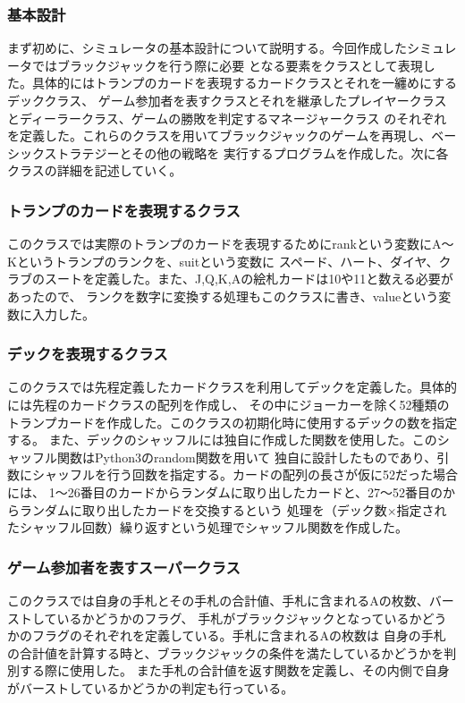 \subsubsection{基本設計}
まず初めに、シミュレータの基本設計について説明する。今回作成したシミュレータではブラックジャックを行う際に必要
となる要素をクラスとして表現した。具体的にはトランプのカードを表現するカードクラスとそれを一纏めにするデッククラス、
ゲーム参加者を表すクラスとそれを継承したプレイヤークラスとディーラークラス、ゲームの勝敗を判定するマネージャークラス
のそれぞれを定義した。これらのクラスを用いてブラックジャックのゲームを再現し、ベーシックストラテジーとその他の戦略を
実行するプログラムを作成した。次に各クラスの詳細を記述していく。

\subsubsection{トランプのカードを表現するクラス}
このクラスでは実際のトランプのカードを表現するためにrankという変数にA～Kというトランプのランクを、suitという変数に
スペード、ハート、ダイヤ、クラブのスートを定義した。また、J,Q,K,Aの絵札カードは10や11と数える必要があったので、
ランクを数字に変換する処理もこのクラスに書き、valueという変数に入力した。

\subsubsection{デックを表現するクラス}
このクラスでは先程定義したカードクラスを利用してデックを定義した。具体的には先程のカードクラスの配列を作成し、
その中にジョーカーを除く52種類のトランプカードを作成した。このクラスの初期化時に使用するデックの数を指定する。
また、デックのシャッフルには独自に作成した関数を使用した。このシャッフル関数はPython3のrandom関数を用いて
独自に設計したものであり、引数にシャッフルを行う回数を指定する。カードの配列の長さが仮に52だった場合には、
1～26番目のカードからランダムに取り出したカードと、27～52番目のからランダムに取り出したカードを交換するという
処理を（デック数×指定されたシャッフル回数）繰り返すという処理でシャッフル関数を作成した。

\subsubsection{ゲーム参加者を表すスーパークラス}
このクラスでは自身の手札とその手札の合計値、手札に含まれるAの枚数、バーストしているかどうかのフラグ、
手札がブラックジャックとなっているかどうかのフラグのそれぞれを定義している。手札に含まれるAの枚数は
自身の手札の合計値を計算する時と、ブラックジャックの条件を満たしているかどうかを判別する際に使用した。
また手札の合計値を返す関数を定義し、その内側で自身がバーストしているかどうかの判定も行っている。

